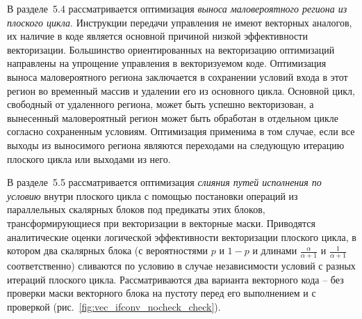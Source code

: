 \documentclass[a4paper,14pt]{extarticle}                     %
\theoremstyle{plain}                                         %
\begin{document}


В разделе~5.4 рассматривается оптимизация \textit{выноса маловероятного региона из плоского цикла}.
Инструкции передачи управления не имеют векторных аналогов, их наличие в коде является основной причиной низкой эффективности векторизации.
Большинство ориентированных на векторизацию оптимизаций направлены на упрощение управления в векторизуемом коде. 
Оптимизация выноса маловероятного региона заключается в сохранении условий входа в этот регион во временный массив и удалении его из основного цикла.
Основной цикл, свободный от удаленного региона, может быть успешно векторизован, а вынесенный маловероятный регион может быть обработан в отдельном цикле согласно сохраненным условиям.
Оптимизация применима в том случае, если все выходы из выносимого региона являются переходами на следующую итерацию плоского цикла или выходами из него.


В разделе~5.5 рассматривается оптимизация \textit{слияния путей исполнения по условию} внутри плоского цикла с помощью постановки операций из параллельных скалярных блоков под предикаты этих блоков, трансформирующиеся при векторизации в векторные маски.
Приводятся аналитические оценки логической эффективности векторизации плоского цикла, в котором два скалярных блока (с вероятностями $p$ и $1 - p$ и длинами $\frac{\alpha}{\alpha + 1}$ и $\frac{1}{\alpha + 1}$ соответственно) сливаются по условию в случае независимости условий с разных итераций плоского цикла.
Рассматриваются два варианта векторного кода -- без проверки маски векторного блока на пустоту перед его выполнением и с проверкой (рис.~\ref{fig:vec_ifconv_nocheck_check}).
\end{document}
